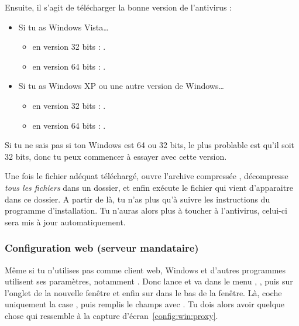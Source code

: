 Ensuite, il s'agit de télécharger la bonne version de l'antivirus :
\begin{itemize}

\item Si tu as Windows Vista\dots
\begin{itemize}
\item en version 32 bits : .
\item en version 64 bits : .
\end{itemize}

\item Si tu as Windows XP ou une autre version de Windows\dots
\begin{itemize}
\item en version 32 bits : .
\item en version 64 bits : .
\end{itemize}
\end{itemize}

Si tu ne sais pas si ton Windows est 64 ou 32 bits, le plus problable est qu'il
soit 32 bits, donc tu peux commencer à essayer avec cette version.

Une fois le fichier adéquat téléchargé, ouvre l'archive compressée , décompresse \emph{tous les fichiers} dans un dossier, et
enfin exécute le fichier  qui vient d'apparaitre dans ce dossier. A partir de là, tu n'as plus qu'à suivre les instructions du
programme d'installation. Tu n'auras alors plus à toucher à l'antivirus, celui-ci sera mis à jour automatiquement.%

\subsubsection{Configuration web (serveur mandataire)}


Même si tu n'utilises pas  comme client web, Windows et d'autres programmes
utilisent ses paramètres, notamment . Donc lance  et va
dans le menu , , puis sur l'onglet  de la
nouvelle fenêtre et enfin sur  dans le bas de la fenêtre. Là, coche
uniquement la case , puis remplis le champs
 avec . Tu dois alors avoir quelque chose qui
ressemble à la capture d'écran~\ref{config:win:proxy}.

